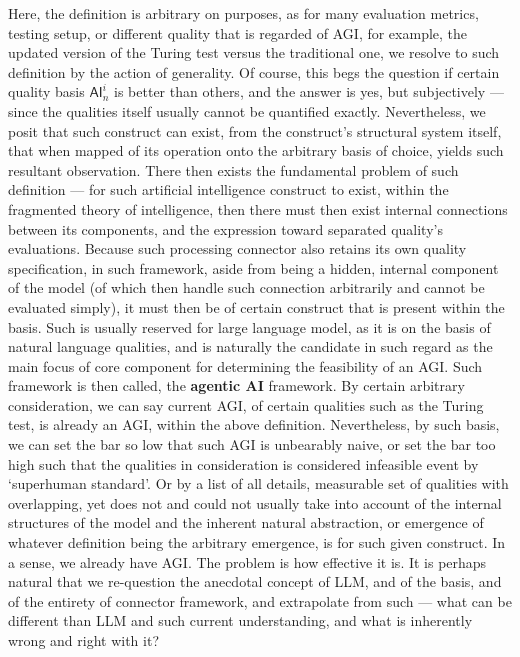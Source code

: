 Here, the definition is arbitrary on purposes, as for many evaluation metrics, testing setup, or different quality that is regarded of AGI, for example, the updated version of the Turing test versus the traditional one, we resolve to such definition by the action of generality. Of course, this begs the question if certain quality basis $\mathsf{AI}_{n}^{i}$ is better than others, and the answer is yes, but subjectively --- since the qualities itself usually cannot be quantified exactly. Nevertheless, we posit that such construct can exist, from the construct's structural system itself, that when mapped of its operation onto the arbitrary basis of choice, yields such resultant observation. There then exists the fundamental problem of such definition --- for such artificial intelligence construct to exist, within the fragmented theory of intelligence, then there must then exist internal connections between its components, and the expression toward separated quality's evaluations. Because such processing connector also retains its own quality specification, in such framework, aside from being a hidden, internal component of the model (of which then handle such connection arbitrarily and cannot be evaluated simply), it must then be of certain construct that is present within the basis. Such is usually reserved for large language model, as it is on the basis of natural language qualities, and is naturally the candidate in such regard as the main focus of core component for determining the feasibility of an AGI. Such framework is then called, the \textbf{agentic AI} framework. By certain arbitrary consideration, we can say current AGI, of certain qualities such as the Turing test, is already an AGI, within the above definition. Nevertheless, by such basis, we can set the bar so low that such AGI is unbearably naive, or set the bar too high such that the qualities in consideration is considered infeasible event by `superhuman standard'. Or by a list of all details, measurable set of qualities with overlapping, yet does not and could not usually take into account of the internal structures of the model and the inherent natural abstraction, or emergence of whatever definition being the arbitrary emergence, is for such given construct. In a sense, we already have AGI. The problem is how effective it is. It is perhaps natural that we re-question the anecdotal concept of LLM, and of the basis, and of the entirety of connector framework, and extrapolate from such --- what can be different than LLM and such current understanding, and what is inherently wrong and right with it?

